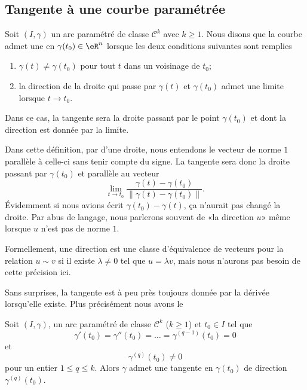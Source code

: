 
\subsection{Tangente à une courbe paramétrée}

\begin{definition}
	Soit \( (I,\gamma)\) un arc paramétré de classe \( \mathcal{C}^k\) avec \( k\geq 1\). Nous disons que la courbe admet une  en \( \gamma(t_0)\in\eR^n\) lorsque les deux conditions suivantes sont remplies
	\begin{enumerate}
		\item
		      \( \gamma(t)\neq \gamma(t_0)\) pour tout \( t\) dans un voisinage de \( t_0\);
		\item
		      la direction de la droite qui passe par \( \gamma(t)\) et \( \gamma(t_0)\) admet une limite lorsque \( t\to t_0\).
	\end{enumerate}
	Dans ce cas, la tangente sera la droite passant par le point \( \gamma(t_0)\) et dont la direction est donnée par la limite.
\end{definition}
Dans cette définition, par  d'une droite, nous entendons le vecteur de norme \( 1\) parallèle à celle-ci sans tenir compte du signe. La tangente sera donc la droite passant par \( \gamma(t_0)\) et parallèle au vecteur
\begin{equation}
	\lim_{t\to t_0}\frac{ \gamma(t)-\gamma(t_0) }{ \| \gamma(t)-\gamma(t_0) \| }.
\end{equation}
Évidemment si nous avions écrit \( \gamma(t_0)-\gamma(t)\), ça n'aurait pas changé la droite. Par abus de langage, nous parlerons souvent de «la direction \( u\)» même lorsque \( u\) n'est pas de norme \( 1\).

Formellement, une direction est une classe d'équivalence de vecteurs pour la relation \( u\sim v\) si il existe \( \lambda\neq 0\) tel que \( u=\lambda v\), mais nous n'aurons pas besoin de cette précision ici.

Sans surprises, la tangente est à peu près toujours donnée par la dérivée lorsqu'elle existe. Plus précisément nous avons le
\begin{theorem}
	Soit \( (I,\gamma)\), un arc paramétré de classe \( \mathcal{C}^k\) (\( k\geq 1\)) et \( t_0\in I\) tel que
	\begin{equation}
		\gamma'(t_0)=\gamma''(t_0)=\ldots=\gamma^{(q-1)}(t_0)=0
	\end{equation}
	et
	\begin{equation}
		\gamma^{(q)}(t_0)\neq 0
	\end{equation}
	pour un entier \( 1\leq q\leq k\). Alors \( \gamma\) admet une tangente en \( \gamma(t_0)\) de direction \( \gamma^{(q)}(t_0)\).
\end{theorem}

